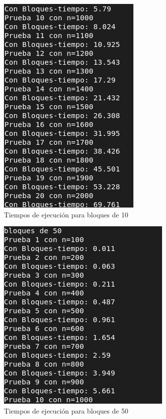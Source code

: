 \documentclass{article}
\begin{document}
\begin{enumerate}
\begin{figure}[h!]
    \centering
   \includegraphics[width=0.5\linewidth]{imagenes/Captura de pantalla de 2023-09-24 21-06-35.png}
   \caption{Tiempos de ejecución para bloques de 10}
   \label{fig:figura3}
\end{figure}




\begin{figure}[h!]
    \centering
   \includegraphics[width=0.5\linewidth]{imagenes/Captura de pantalla de 2023-09-24 20-51-51.png}
   \caption{Tiempos de ejecución para bloques de 50}
   \label{fig:figura4}
\end{figure}


\end{enumerate}
\end{document}
